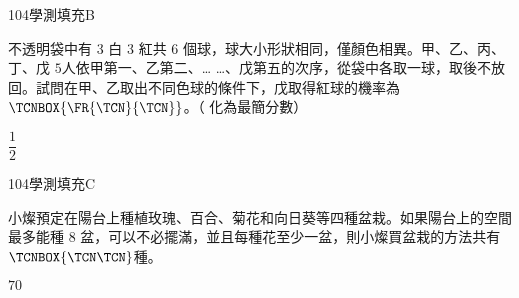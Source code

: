     \begin{QUESTION}
        \begin{ExamInfo}{104}{學測}{填充}{B}
        \end{ExamInfo}
        \begin{ExamAnsRateInfo}{39}{64}{35}{18}
        \end{ExamAnsRateInfo}
        \begin{QBODY}
            不透明袋中有 $3$ 白 $3$ 紅共 $6$ 個球，球大小形狀相同，僅顏色相異。甲、乙、丙、丁、戊 $5$人依甲第一、乙第二、… …、戊第五的次序，從袋中各取一球，取後不放回。試問在甲、乙取出不同色球的條件下，戊取得紅球的機率為$\TCNBOX{\FR{\TCN}{\TCN}}$。（ 化為最簡分數）
        \end{QBODY}
        \begin{QFROMS}
        \end{QFROMS}
        \begin{QTAGS}\end{QTAGS}
        \begin{QANS}
            $\dfrac{1}{2}$
        \end{QANS}
        \begin{QSOLLIST}
        \end{QSOLLIST}
        \begin{QEMPTYSPACE}
        \end{QEMPTYSPACE}
    \end{QUESTION}
    \begin{QUESTION}
        \begin{ExamInfo}{104}{學測}{填充}{C}
        \end{ExamInfo}
        \begin{ExamAnsRateInfo}{21}{49}{11}{3}
        \end{ExamAnsRateInfo}
        \begin{QBODY}
            小燦預定在陽台上種植玫瑰、百合、菊花和向日葵等四種盆栽。如果陽台上的空間最多能種 $8$ 盆，可以不必擺滿，並且每種花至少一盆，則小燦買盆栽的方法共有$\TCNBOX{\TCN\TCN}$種。
        \end{QBODY}
        \begin{QFROMS}
        \end{QFROMS}
        \begin{QTAGS}\end{QTAGS}
        \begin{QANS}
            $70$
        \end{QANS}
        \begin{QSOLLIST}
        \end{QSOLLIST}
        \begin{QEMPTYSPACE}
        \end{QEMPTYSPACE}
    \end{QUESTION}
